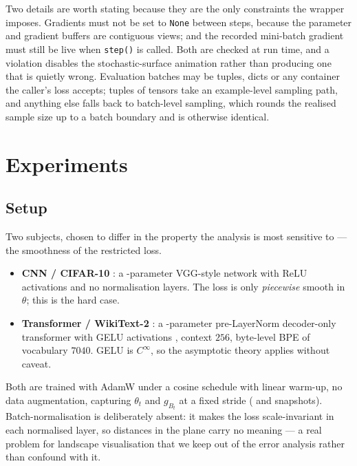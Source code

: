 \documentclass[11pt]{article}
\theoremstyle{definition}
\begin{document}
Two details are worth stating because they are the only constraints the wrapper imposes.
Gradients must not be set to \texttt{None} between steps, because the parameter and
gradient buffers are contiguous views; and the recorded mini-batch gradient must still be
live when \texttt{step()} is called. Both are checked at run time, and a violation
disables the stochastic-surface animation rather than producing one that is quietly
wrong. Evaluation batches may be tuples, dicts or any container the caller's loss
accepts; tuples of tensors take an example-level sampling path, and anything else falls
back to batch-level sampling, which rounds the realised sample size up to a batch
boundary and is otherwise identical.

\section{Experiments}
\label{sec:experiments}

\subsection{Setup}

Two subjects, chosen to differ in the property the analysis is most sensitive to ---
the smoothness of the restricted loss.

\begin{itemize}[leftmargin=1.4em,itemsep=1pt]
\item \textbf{CNN / CIFAR-10} \citep{krizhevsky2009learning}: a \CNNparams-parameter
VGG-style network with ReLU activations and no normalisation layers. The loss is only
\emph{piecewise} smooth in $\theta$; this is the hard case.
\item \textbf{Transformer / WikiText-2} \citep{merity2017pointer}: a
\GPTparams-parameter pre-LayerNorm decoder-only transformer
\citep{vaswani2017attention} with GELU activations
\citep{hendrycks2016gaussian}, context $256$, byte-level BPE of vocabulary $7040$. GELU
is $C^\infty$, so the asymptotic theory applies without caveat.
\end{itemize}

Both are trained with AdamW \citep{loshchilov2019decoupled} under a cosine schedule with
linear warm-up, no data augmentation, capturing $\theta_t$ and $g_{B_t}$ at a fixed
stride (\CNNsnaps{} and \GPTsnaps{} snapshots). Batch-normalisation is deliberately
absent: it makes the loss scale-invariant in each normalised layer, so distances in the
plane carry no meaning --- a real problem for landscape visualisation that we keep out
of the error analysis rather than confound with it.
\end{document}
